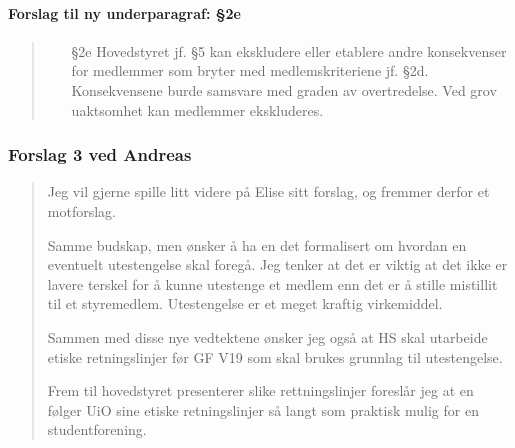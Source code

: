 \documentclass[10pt,norsk,a4paper]{article}
\begin{document}
\paragraph{Forslag til ny underparagraf: §2e}
\begin{quote}
    \begin{enumerate}
        \item[§2e]
            Hovedstyret jf. §5 kan ekskludere eller etablere andre konsekvenser for medlemmer som bryter med medlemskriteriene jf. §2d.
            Konsekvensene burde samsvare med graden av overtredelse. Ved grov uaktsomhet kan medlemmer ekskluderes.
    \end{enumerate}
\end{quote}

\subsubsection{Forslag 3 ved Andreas}
\begin{quote}
Jeg vil gjerne spille litt videre på Elise sitt forslag, og fremmer derfor et motforslag.

Samme budskap, men ønsker å ha en det formalisert om hvordan en eventuelt utestengelse skal foregå.
Jeg tenker at det er viktig at det ikke er lavere terskel for å kunne utestenge et medlem enn det er å stille mistillit til et styremedlem.
Utestengelse er et meget kraftig virkemiddel.

Sammen med disse nye vedtektene ønsker jeg også at HS skal utarbeide etiske retningslinjer før GF V19 som skal brukes grunnlag til utestengelse.

Frem til hovedstyret presenterer slike rettningslinjer foreslår jeg at en følger UiO sine etiske retningslinjer så langt som praktisk mulig for en studentforening.
\end{quote}
\end{document}
